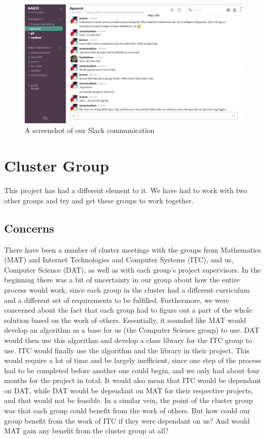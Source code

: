 \documentclass{article}
\begin{document}
\begin{figure}
	\centering
	\includegraphics[width=1\textwidth]{figures/slack.png}
	\caption{A screenshot of our Slack communication}
	\label{fig:slack}
\end{figure}



\section{Cluster Group}
This project has had a different element to it. We have had to work with two other groups and try and get these groups to work together.
\subsection*{Concerns}
There have been a number of cluster meetings with the groups from Mathematics (MAT) and Internet Technologies and Computer Systems (ITC), and us, Computer Science (DAT), as well as with each group's project supervisors.
In the beginning there was a bit of uncertainty in our group about how the entire process would work, since each group in the cluster had a different curriculum and a different set of requirements to be fulfilled.
Furthermore, we were concerned about the fact that each group had to figure out a part of the whole solution based on the work of others.
Essentially, it sounded like MAT would develop an algorithm as a base for us (the Computer Science group) to use.
DAT would then use this algorithm and develop a class library for the ITC group to use.
ITC would finally use the algorithm and the library in their project.
This would require a lot of time and be largely inefficient, since one step of the process had to be completed before another one could begin, and we only had about four months for the project in total.
It would also mean that ITC would be dependant on DAT, while DAT would be dependant on MAT for their respective projects, and that would not be feasible.
In a similar vein, the point of the cluster group was that each group could benefit from the work of others.
But how could our group benefit from the work of ITC if they were dependant on us? And would MAT gain any benefit from the cluster group at all?
\end{document}
